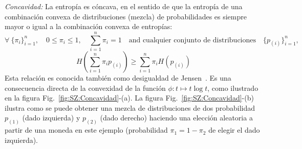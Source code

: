 \begin{propiedades}
  \begin{figure}[h!]
  \begin{center}  \end{center}
  \label{fig:SZ:Recursividad}
  \end{figure}
%
\setcounter{PropConcavidad}{\value{enumi}}
\item\label{prop:SZ:concavidad} {\it Concavidad:} La entrop\'ia es c\'oncava, en
  el sentido de que la entrop\'ia de una combinaci\'on convexa de distribuciones
  (mezcla) de probabilidades es siempre mayor o igual a la combinaci\'on convexa
  de entrop\'ias:
  \[
  \forall \:  \{ \pi_i \}_{i=1}^n, \quad  0 \le \pi_i \le  1, \quad \sum_{i=1}^n
  \pi_i  = 1  \quad \mbox{and  cualquier  conjunto de  distribuciones} \quad  \{
  p_{(i)} \}_{i=1}^n,
  \]
  \[
  H\left( \sum_{i=1}^n \pi_i p_{(i)} \right) \ge \sum_{i=1}^n \pi_i H(p_{(i)})
  \]
  Esta relaci\'on es conocida tambi\'en como desigualdad de Jensen~\cite{Jen06}.
  Es una consecuencia directa de la  convexidad de la funci\'on $\phi: t \mapsto
  t \log  t$, como ilustrado en la  figura Fig.~\ref{fig:SZ:Concavidad}-(a).  La
  figura  Fig.~\ref{fig:SZ:Concavidad}-(b)  ilustra como  se  puede obtener  una
  mezcla  de distribuciones  de dos  probabilidad $p_{(1)}$  (dado  izquierda) y
  $p_{(2)}$ (dado  derecho) haciendo  una elecci\'on aleatoria  a partir  de una
  moneda en  este ejemplo (probabilidad  $\pi_1 = 1  - \pi_2$ de elegir  el dado
  izquierda).\newline
  \begin{figure}[h!]
  \begin{center}  \end{center}
\end{figure}
\end{propiedades}
